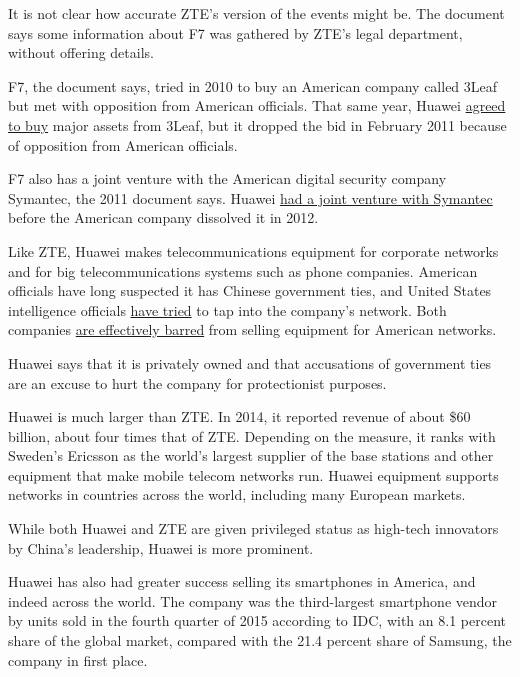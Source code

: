 It is not clear how accurate ZTE's version of the events might be. The
document says some information about F7 was gathered by ZTE's legal
department, without offering details.

F7, the document says, tried in 2010 to buy an American company called
3Leaf but met with opposition from American officials. That same year,
Huawei
\href{http://dealbook.nytimes.com/2011/02/18/the-big-chill-huawei-imbroglio-puts-countries-at-odds/}{agreed
to buy} major assets from 3Leaf, but it dropped the bid in February 2011
because of opposition from American officials.

F7 also has a joint venture with the American digital security company
Symantec, the 2011 document says. Huawei
\href{http://www.nytimes.com/2012/03/27/technology/symantec-dissolves-alliance-with-huawei-of-china.html}{had
a joint venture with Symantec} before the American company dissolved it
in 2012.

Like ZTE, Huawei makes telecommunications equipment for corporate
networks and for big telecommunications systems such as phone companies.
American officials have long suspected it has Chinese government ties,
and United States intelligence officials
\href{http://www.nytimes.com/2014/03/23/world/asia/nsa-breached-chinese-servers-seen-as-spy-peril.html}{have
tried} to tap into the company's network. Both companies
\href{http://www.nytimes.com/2012/10/09/us/us-panel-calls-huawei-and-zte-national-security-threat.html}{are
effectively barred} from selling equipment for American networks.

Huawei says that it is privately owned and that accusations of
government ties are an excuse to hurt the company for protectionist
purposes.

Huawei is much larger than ZTE. In 2014, it reported revenue of about
\$60 billion, about four times that of ZTE. Depending on the measure, it
ranks with Sweden's Ericsson as the world's largest supplier of the base
stations and other equipment that make mobile telecom networks run.
Huawei equipment supports networks in countries across the world,
including many European markets.

While both Huawei and ZTE are given privileged status as high-tech
innovators by China's leadership, Huawei is more prominent.

Huawei has also had greater success selling its smartphones in America,
and indeed across the world. The company was the third-largest
smartphone vendor by units sold in the fourth quarter of 2015 according
to IDC, with an 8.1 percent share of the global market, compared with
the 21.4 percent share of Samsung, the company in first place.

